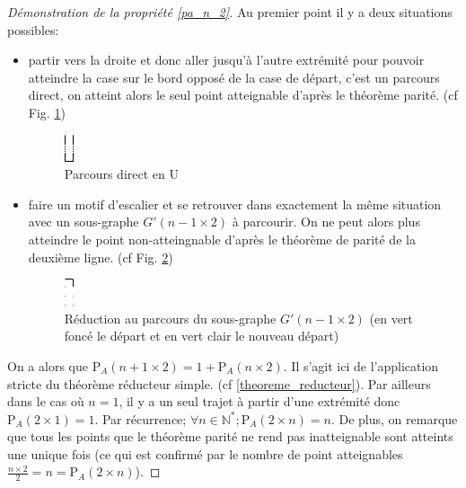 \documentclass[twoside, a4paper, 12pt]{report}
\newcommand{\pa}[2]{\ensuremath{\text{P}_A\left(#1 \times #2\right)}}
\begin{document}
\begin{proof}[Démonstration de la propriété \ref{pa_n_2}]
Au premier point il y a deux situations possibles:
\begin{itemize}
\item partir vers la droite et donc aller jusqu'à l'autre extrémité pour pouvoir atteindre la case sur le bord opposé de la case de départ, c'est un parcours direct, on atteint alors le seul point atteignable d'après le théorème parité. (cf Fig. \ref{direct_u})
\begin{figure}[h]
\centering\includegraphics[angle=90, scale=5]{direct_u.png}
\caption{Parcours direct en U}
\label{direct_u}
\end{figure}
\item faire un motif d'escalier et se retrouver dans exactement la même situation avec un sous-graphe $G'(n-1\times 2)$ à parcourir. On ne peut alors plus atteindre le point non-atteingnable d'après le théorème de parité de la deuxième ligne. (cf Fig. \ref{reduction})
\begin{figure}[h]
\centering\includegraphics[angle=90, scale=5]{reduction.png}
\caption[Réduction au parcours du sous-graphe $G'(n-1\times 2)$]{Réduction au parcours du sous-graphe $G'(n-1\times 2)$ (en vert foncé le départ et en vert clair le nouveau départ)}
\label{reduction}
\end{figure}
\end{itemize}
On a alors que $\pa{n+1}{2} = 1 + \pa{n}{2}$. Il s'agit ici de l'application stricte du théorème réducteur simple. (cf \ref{theoreme_reducteur}). Par ailleurs dans le cas où $n=1$, il y a un seul trajet à partir d'une extrémité donc $\pa{2}{1} = 1$. Par récurrence; $\forall n \in \mathbb{N}^*; \pa{2}{n} = n$. De plus, on remarque que tous les points que le théorème parité ne rend pas inatteignable sont atteints une unique fois (ce qui est confirmé par le nombre de point atteignables $\frac{n \times 2}{2} = n = \pa{2}{n}$).
\end{proof}
\end{document}
